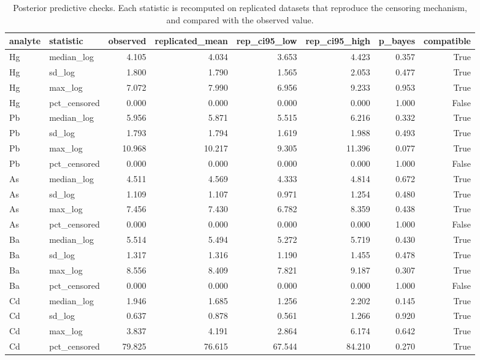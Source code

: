 \begin{table}[htbp]
\centering
\caption{Posterior predictive checks. Each statistic is recomputed on replicated datasets that reproduce the censoring mechanism, and compared with the observed value.}
\label{tab:ppc}
\footnotesize
\begin{tabular}{llrrrrrr}
\toprule
analyte & statistic & observed & replicated\_mean & rep\_ci95\_low & rep\_ci95\_high & p\_bayes & compatible \\
\midrule
Hg & median\_log & 4.105 & 4.034 & 3.653 & 4.423 & 0.357 & True \\
Hg & sd\_log & 1.800 & 1.790 & 1.565 & 2.053 & 0.477 & True \\
Hg & max\_log & 7.072 & 7.990 & 6.956 & 9.233 & 0.953 & True \\
Hg & pct\_censored & 0.000 & 0.000 & 0.000 & 0.000 & 1.000 & False \\
Pb & median\_log & 5.956 & 5.871 & 5.515 & 6.216 & 0.332 & True \\
Pb & sd\_log & 1.793 & 1.794 & 1.619 & 1.988 & 0.493 & True \\
Pb & max\_log & 10.968 & 10.217 & 9.305 & 11.396 & 0.077 & True \\
Pb & pct\_censored & 0.000 & 0.000 & 0.000 & 0.000 & 1.000 & False \\
As & median\_log & 4.511 & 4.569 & 4.333 & 4.814 & 0.672 & True \\
As & sd\_log & 1.109 & 1.107 & 0.971 & 1.254 & 0.480 & True \\
As & max\_log & 7.456 & 7.430 & 6.782 & 8.359 & 0.438 & True \\
As & pct\_censored & 0.000 & 0.000 & 0.000 & 0.000 & 1.000 & False \\
Ba & median\_log & 5.514 & 5.494 & 5.272 & 5.719 & 0.430 & True \\
Ba & sd\_log & 1.317 & 1.316 & 1.190 & 1.455 & 0.478 & True \\
Ba & max\_log & 8.556 & 8.409 & 7.821 & 9.187 & 0.307 & True \\
Ba & pct\_censored & 0.000 & 0.000 & 0.000 & 0.000 & 1.000 & False \\
Cd & median\_log & 1.946 & 1.685 & 1.256 & 2.202 & 0.145 & True \\
Cd & sd\_log & 0.637 & 0.878 & 0.561 & 1.266 & 0.920 & True \\
Cd & max\_log & 3.837 & 4.191 & 2.864 & 6.174 & 0.642 & True \\
Cd & pct\_censored & 79.825 & 76.615 & 67.544 & 84.210 & 0.270 & True \\
\bottomrule
\end{tabular}
\end{table}
